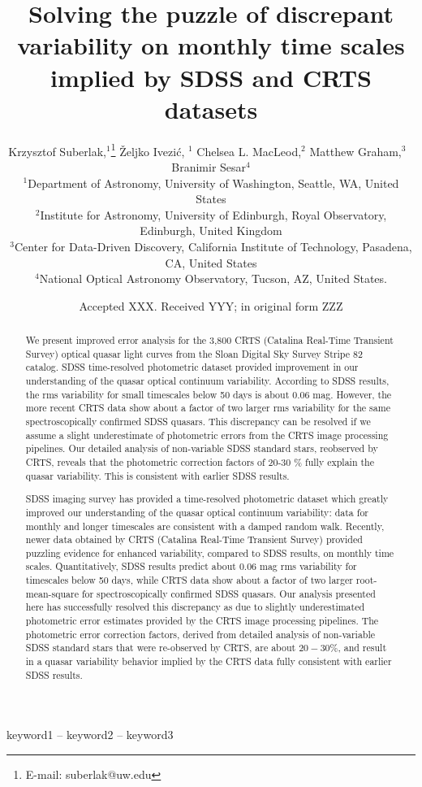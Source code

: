 \documentclass[a4paper,fleqn,usenatbib]{mnras}
\title[Quasar Variability]{Solving the puzzle of discrepant variability on monthly time scales implied by SDSS and CRTS datasets}
\author[K. Suberlak et al.]{
Krzysztof Suberlak,$^{1}$\thanks{E-mail: suberlak@uw.edu}
\v{Z}eljko Ivezi\'c, $^{1}$
Chelsea L. MacLeod,$^{2}$
Matthew Graham,$^{3}$ 
\newauthor
$\, \,  $Branimir Sesar$^{4}$
\\
$^{1}$Department of Astronomy, University of Washington, Seattle, WA, United States\\
$^{2}$Institute for Astronomy, University of Edinburgh, Royal Observatory, Edinburgh, United Kingdom\\
$^{3}$Center for Data-Driven Discovery, California Institute of Technology, Pasadena, CA, United States\\
$^{4}$National Optical Astronomy Observatory, Tucson, AZ, United States.
}
\date{Accepted XXX. Received YYY; in original form ZZZ}
\begin{document}
\label{firstpage}
\pagerange{\pageref{firstpage}--\pageref{lastpage}}
\maketitle

\begin{abstract}

We present improved error analysis for the 3,800 CRTS (Catalina Real-Time Transient Survey) optical quasar light curves from the Sloan Digital Sky Survey Stripe 82 catalog. SDSS time-resolved photometric dataset provided improvement in our understanding of the quasar optical continuum variability. According to SDSS results, the rms variability for small timescales  below 50 days is about 0.06 mag. However,  the more recent CRTS data show about a factor of two larger rms variability for the same spectroscopically confirmed SDSS quasars.  This discrepancy can be resolved if we assume a slight underestimate of photometric errors from the CRTS image processing pipelines. Our detailed analysis of non-variable SDSS standard stars, reobserved by CRTS, reveals that the photometric correction factors of 20-30 \% fully explain the quasar variability. This is consistent with earlier SDSS results.

SDSS imaging survey has provided a time-resolved photometric  dataset which greatly improved our understanding of the quasar
optical continuum variability: data for monthly and longer timescales  are consistent with a damped random walk. Recently, newer data  obtained by CRTS (Catalina Real-Time Transient Survey) provided  puzzling evidence for enhanced variability, compared to SDSS results, on monthly time scales. Quantitatively, SDSS results predict  about $0.06$ mag rms variability for timescales below 50 days, while CRTS data show about a factor of two larger root-mean-square  for spectroscopically confirmed SDSS quasars. Our analysis presented here has successfully resolved this discrepancy as due to slightly underestimated photometric error estimates provided by the CRTS image processing pipelines. The photometric error correction factors, derived from detailed analysis of non-variable SDSS standard stars that were re-observed by CRTS, are about $20-30\%$, and result in a quasar variability behavior implied by the CRTS data fully consistent with earlier SDSS results.


\end{abstract}

\begin{keywords}
keyword1 -- keyword2 -- keyword3
\end{keywords}
\end{document}
